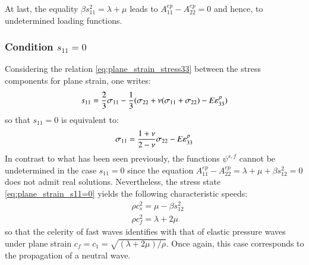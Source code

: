 At last, the equality $\beta s_{11}^2 = \lambda + \mu$ leads to $A_{11}^{ep}-A_{22}^{ep}=0$ and hence, to undetermined loading functions. 


\subsubsection{Condition $s_{11}=0$}
Considering the relation \eqref{eq:plane_strain_stress33} between the stress components for plane strain, one writes:
\begin{equation*}
  s_{11}= \frac{2}{3}\sigma_{11}-\frac{1}{3}(\sigma_{22}+\nu(\sigma_{11}+\sigma_{22})-E\varepsilon^p_{33})
\end{equation*}
so that $s_{11}=0$ is equivalent to:
\begin{equation}
  \label{eq:plane_strain_s11=0}
  \sigma_{11}=\frac{1+\nu}{2-\nu}\sigma_{22}-E\varepsilon^p_{33}
\end{equation}
In contrast to what has been seen previously, the functions $\psi^{s,f}$ cannot be undetermined in the case $s_{11}=0$ since the equation $A_{11}^{ep}-A_{22}^{ep}=\lambda + \mu + \beta s_{12}^2=0$ does not admit real solutions.
Nevertheless, the stress state \eqref{eq:plane_strain_s11=0} yields the following characteristic speeds:
\begin{align*}
  & \rho c_s^2 = \mu -\beta s_{12}^2 \\
  & \rho c_f^2 = \lambda +2\mu 
\end{align*}
so that the celerity of fast waves identifies with that of elastic pressure waves under plane strain $c_f=c_1=\sqrt{(\lambda + 2\mu)/\rho}$. %
Once again, this case corresponds to the propagation of a neutral wave.


